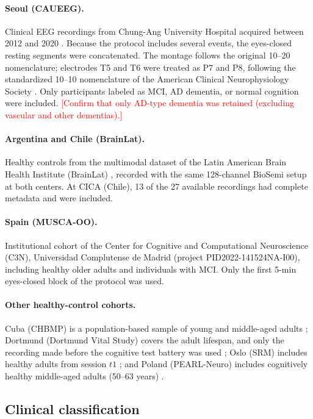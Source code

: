 \documentclass[11pt]{article}
\newcommand{\pend}[1]{\textcolor{red}{[#1]}}
\begin{document}
\paragraph{Seoul (CAUEEG).}
Clinical EEG recordings from Chung-Ang University Hospital acquired between 2012 and 2020 \cite{KimCAUEEG2023}. Because the protocol includes several events, the eyes-closed resting segments were concatenated. The montage follows the original 10--20 nomenclature; electrodes T5 and T6 were treated as P7 and P8, following the standardized 10--10 nomenclature of the American Clinical Neurophysiology Society \cite{Acharya2016}. Only participants labeled as MCI, AD dementia, or normal cognition were included. \pend{Confirm that only AD-type dementia was retained (excluding vascular and other dementias).}

\paragraph{Argentina and Chile (BrainLat).}
Healthy controls from the multimodal dataset of the Latin American Brain Health Institute (BrainLat) \cite{Prado2023}, recorded with the same 128-channel BioSemi setup at both centers. At CICA (Chile), 13 of the 27 available recordings had complete metadata and were included.

\paragraph{Spain (MUSCA-OO).}
Institutional cohort of the Center for Cognitive and Computational Neuroscience (C3N), Universidad Complutense de Madrid (project PID2022-141524NA-I00), including healthy older adults and individuals with MCI. Only the first 5-min eyes-closed block of the protocol was used.

\paragraph{Other healthy-control cohorts.}
Cuba (CHBMP) is a population-based sample of young and middle-aged adults \cite{ValdesSosa2021}; Dortmund (Dortmund Vital Study) covers the adult lifespan, and only the recording made before the cognitive test battery was used \cite{Getzmann2024}; Oslo (SRM) includes healthy adults from session $t1$ \cite{HatlestadHall2022}; and Poland (PEARL-Neuro) includes cognitively healthy middle-aged adults (50--63 years) \cite{Dzianok2024}.

\subsection{Clinical classification}
\end{document}
